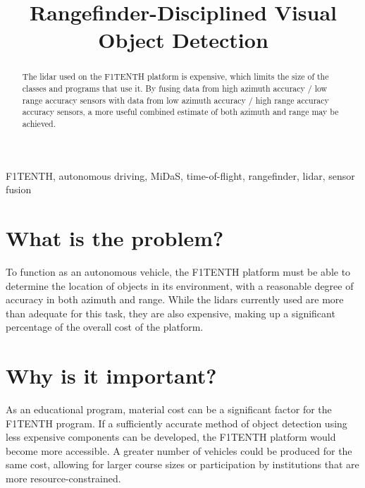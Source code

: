 \documentclass[conference]{IEEEtran}
\begin{document}
\title{Rangefinder-Disciplined Visual Object Detection}

\author{
\and
\and
\and
}

\maketitle

\begin{abstract}
The lidar used on the F1TENTH platform is expensive, which limits the size of
the classes and programs that use it. By fusing data from high azimuth accuracy
/ low range accuracy sensors with data from low azimuth accuracy / high range
accuracy accuracy sensors, a more useful combined estimate of both azimuth and
range may be achieved.
\end{abstract}

\begin{IEEEkeywords}
F1TENTH, autonomous driving, MiDaS, time-of-flight, rangefinder, lidar, sensor
fusion
\end{IEEEkeywords}

\section{What is the problem?}
To function as an autonomous vehicle, the F1TENTH platform must be able to
determine the location of objects in its environment, with a reasonable degree
of accuracy in both azimuth and range. While the lidars currently used are more
than adequate for this task, they are also expensive, making up a significant
percentage of the overall cost of the platform.


\section{Why is it important?}
As an educational program, material cost can be a significant factor for the
F1TENTH program. If a sufficiently accurate method of object detection using
less expensive components can be developed, the F1TENTH platform would become
more accessible. A greater number of vehicles could be produced for the same
cost, allowing for larger course sizes or participation by institutions that
are more resource-constrained.
\end{document}
